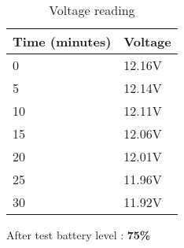 \begin{table}[H]
	\centering
	\caption{Voltage reading}
	\begin{tabular}{ll}
	\hline
	\textbf{Time (minutes)} & \textbf{Voltage}\\
	\hline
    0 & 12.16V \\
    5 & 12.14V \\
    10 & 12.11V \\
    15 & 12.06V \\
    20 & 12.01V \\
    25 & 11.96V \\
    30 & 11.92V \\
	\hline
	\end{tabular}
\end{table}
\centering
After test battery level : \textbf{75\%}
